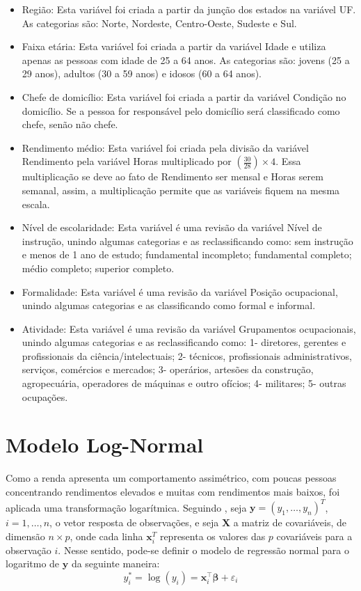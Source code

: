 \documentclass[12pt,a4paper,header]{abnt}
\begin{document}
\begin{itemize}
    \item[\textbf{•}]Região: Esta variável foi criada a partir da junção dos estados na variável UF. As categorias são: Norte, Nordeste, Centro-Oeste, Sudeste e Sul.
    \item[\textbf{•}]Faixa etária: Esta variável foi criada a partir da variável Idade e utiliza apenas as pessoas com idade de 25 a 64 anos. As categorias são: jovens (25 a 29 anos), adultos (30 a 59 anos) e idosos (60 a 64 anos).
    \item[\textbf{•}]Chefe de domicílio: Esta variável foi criada a partir da variável Condição no domicílio. Se a pessoa for responsável pelo domicílio será classificado como chefe, senão não chefe.
    \item[\textbf{•}]Rendimento médio: Esta variável foi criada pela divisão da variável Rendimento pela variável Horas multiplicado por \(\left(\frac{30}{28}\right)\times 4\). Essa multiplicação se deve ao fato de Rendimento ser mensal e Horas serem semanal, assim, a multiplicação permite que as variáveis fiquem na mesma escala.
    \item[\textbf{•}]Nível de escolaridade: Esta variável é uma revisão da variável Nível de instrução, unindo algumas categorias e as reclassificando como: sem instrução e menos de 1 ano de estudo; fundamental incompleto; fundamental completo; médio completo; superior completo.
    \item[\textbf{•}]Formalidade: Esta variável é uma revisão da variável Posição ocupacional, unindo algumas categorias e as classificando como formal e informal. 
    \item[\textbf{•}]Atividade: Esta variável é uma revisão da variável Grupamentos ocupacionais, unindo algumas categorias e as reclassificando como: 1- diretores, gerentes e profissionais da ciência/intelectuais; 2- técnicos, profissionais administrativos, serviços, comércios e mercados; 3- operários, artesões da construção, agropecuária, operadores de máquinas e outro ofícios; 4- militares; 5- outras ocupações.
\end{itemize}


\section{Modelo Log-Normal}
Como a renda apresenta um comportamento assimétrico, com poucas pessoas concentrando rendimentos elevados e muitas com rendimentos mais baixos, foi aplicada uma transformação logarítmica. Seguindo , seja $\textbf{y} = (y_1, \ldots, y_n)^T$, $i=1,\ldots,n$, o vetor resposta de observações, e seja $\textbf{X}$ a matriz
 de covariáveis, de dimensão $n\times p$, onde cada linha $\textbf{x}_i^T$ representa os valores das $p$ covariáveis para a observação $i$. Nesse sentido, pode-se definir o modelo de regressão normal para o logaritmo de $\textbf{y}$ da seguinte maneira:
\begin{equation}
y_i^* = \log(y_i) = \mathbf{x}_i^\top \boldsymbol{\beta} + \varepsilon_i
\label{eq:lognormal_model1}
\end{equation}
\end{document}
